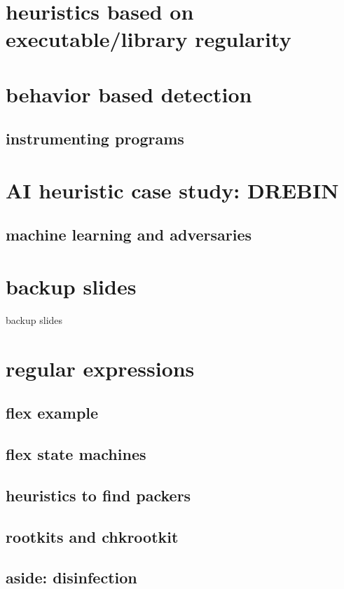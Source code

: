 \section{heuristics based on executable/library regularity}


\section{behavior based detection}


\subsection{instrumenting programs}


\section{AI heuristic case study: DREBIN}


\subsection{machine learning and adversaries}



\section{backup slides}
\begin{frame}{backup slides}
\end{frame}

\section{regular expressions}


\subsection{flex example}


\subsection{flex state machines}



\subsection{heuristics to find packers}



\subsection{rootkits and chkrootkit}


\subsection{aside: disinfection}

